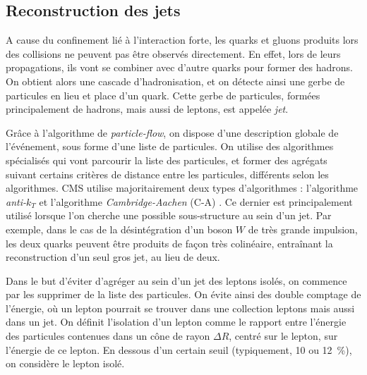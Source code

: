 \subsection{Reconstruction des jets}


A cause du confinement lié à l'interaction forte, les quarks et gluons produits lors des collisions ne peuvent pas être observés directement. En effet, lors de leurs propagations, ils vont se combiner avec d'autre quarks pour former des hadrons. On obtient alors une cascade d'hadronisation, et on détecte ainsi une gerbe de particules en lieu et place d'un quark. Cette gerbe de particules, formées principalement de hadrons, mais aussi de leptons, est appelée \emph{jet}. %

Grâce à l'algorithme de \emph{particle-flow}, on dispose d'une description globale de l'événement, sous forme d'une liste de particules. On utilise des algorithmes spécialisés qui vont parcourir la liste des particules, et former des agrégats suivant certains critères de distance entre les particules, différents selon les algorithmes. CMS utilise majoritairement deux types d'algorithmes : l'algorithme \emph{anti-$k_T$} \citep{antikt} et l'algorithme \emph{Cambridge-Aachen} (C-A) \citep{ca_jets}. Ce dernier est principalement utilisé lorsque l'on cherche une possible sous-structure au sein d'un jet. Par exemple, dans le cas de la désintégration d'un boson $W$ de très grande impulsion, les deux quarks peuvent être produits de façon très colinéaire, entraînant la reconstruction d'un seul gros jet, au lieu de deux.

Dans le but d'éviter d’agréger au sein d'un jet des leptons isolés, on commence par les supprimer de la liste des particules. On évite ainsi des double comptage de l'énergie, où un lepton pourrait se trouver dans une collection leptons mais aussi dans un jet. On définit l'isolation d'un lepton comme le rapport entre l'énergie des particules contenues dans un cône de rayon $\Delta R$, centré sur le lepton, sur l'énergie de ce lepton. En dessous d'un certain seuil (typiquement, \num{10} ou \SI{12}{\%}), on considère le lepton isolé.

